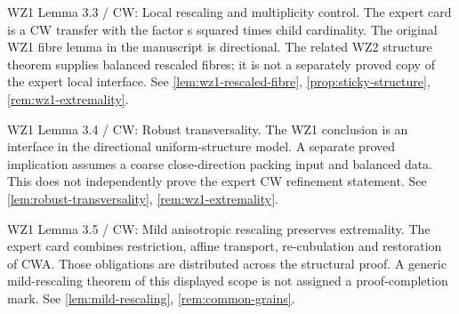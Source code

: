 \begin{remark}
\label{rem:atlas-L3_3}
WZ1 Lemma 3.3 / CW: Local rescaling and multiplicity control.
The expert card is a CW transfer with the factor s squared times child cardinality. The original WZ1 fibre lemma in the manuscript is directional. The related WZ2 structure theorem supplies balanced rescaled fibres; it is not a separately proved copy of the expert local interface.
See \ref{lem:wz1-rescaled-fibre}, \ref{prop:sticky-structure}, \ref{rem:wz1-extremality}.
\end{remark}

\begin{remark}
\label{rem:atlas-L3_4}
WZ1 Lemma 3.4 / CW: Robust transversality.
The WZ1 conclusion is an interface in the directional uniform-structure model. A separate proved implication assumes a coarse close-direction packing input and balanced data. This does not independently prove the expert CW refinement statement.
See \ref{lem:robust-transversality}, \ref{rem:wz1-extremality}.
\end{remark}

\begin{remark}
\label{rem:atlas-L3_5}
WZ1 Lemma 3.5 / CW: Mild anisotropic rescaling preserves extremality.
The expert card combines restriction, affine transport, re-cubulation and restoration of CWA. Those obligations are distributed across the structural proof. A generic mild-rescaling theorem of this displayed scope is not assigned a proof-completion mark.
See \ref{lem:mild-rescaling}, \ref{rem:common-grains}.
\end{remark}


